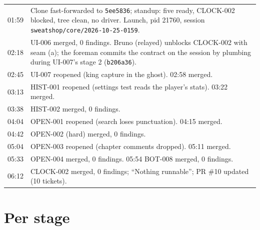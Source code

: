 \documentclass[11pt,a4paper]{article}
\begin{document}
\begin{tabularx}{\linewidth}{@{}lX@{}}
\toprule
01:59 & Clone fast-forwarded to \texttt{5ee5836}; standup: five ready, CLOCK-002 blocked, tree clean, no driver. Launch, pid 21760, session \texttt{sweatshop/core/2026-10-25-0159}. \\
02:18 & UI-006 merged, 0 findings. Bruno (relayed) unblocks CLOCK-002 with seam (a); the foreman commits the contract on the session by plumbing during UI-007's stage 2 (\texttt{b206a36}). \\
02:45 & UI-007 reopened (king capture in the ghost). 02:58 merged. \\
03:13 & HIST-001 reopened (settings test reads the player's stats). 03:22 merged. \\
03:38 & HIST-002 merged, 0 findings. \\
04:04 & OPEN-001 reopened (search loses punctuation). 04:15 merged. \\
04:42 & OPEN-002 (hard) merged, 0 findings. \\
05:04 & OPEN-003 reopened (chapter comments dropped). 05:11 merged. \\
05:33 & OPEN-004 merged, 0 findings. 05:54 BOT-008 merged, 0 findings. \\
06:12 & CLOCK-002 merged, 0 findings; ``Nothing runnable''; PR \#10 updated (10 tickets). \\
\bottomrule
\end{tabularx}

\section*{Per stage}
\end{document}
